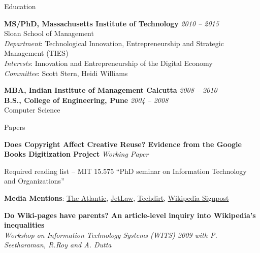 \documentclass{resume} %
\begin{document}

\begin{rSection}{Education}

{\bf MS/PhD, Massachusetts Institute of Technology} \hfill {\em 2010 -- 2015} \\ 
 Sloan School of Management  \smallskip \\
\emph{Department}: Technological Innovation, Entrepreneurship and Strategic Management (TIES) \\
\emph{Interests}: Innovation and Entrepreneurship of the Digital Economy\\
\emph{Committee}: Scott Stern, Heidi Williams

{\bf MBA, Indian Institute of Management Calcutta} \hfill {\em 2008 -- 2010} \\ 

{\bf B.S., College of Engineering, Pune} \hfill {\em 2004 -- 2008} \\ 
Computer Science

\end{rSection}


\begin{rSection}{Papers}

{\bf Does Copyright Affect Creative Reuse? Evidence from the Google Books Digitization Project} \emph{Working Paper}
\begin{rSubsection}{}{}{}{}
\item Required reading list -- MIT 15.575 ``PhD seminar on Information Technology and Organizations''
\item \textbf{Media Mentions}: \href{http://www.theatlantic.com/technology/archive/2012/07/mit-economist-heres-how-copyright-laws-impoverish-wikipedia/259970/}{The Atlantic}, \href{http://www.jetlaw.org/2012/07/26/copyright-law-and-wikipedia/}{JetLaw}, \href{http://www.techdirt.com/articles/20120719/04103519759/new-research-shows-how-copyright-law-is-keeping-useful-info-off-wikipedia.shtml}{Techdirt}, \href{http://en.wikipedia.org/wiki/Wikipedia:Wikipedia_Signpost/2012-07-30/Recent_research#How_Wikipedia_articles_benefit_from_the_availability_of_public_domain_resources}{Wikipedia Signpost}
\end{rSubsection}

{\bf Do Wiki-pages have parents? An article-level inquiry into Wikipedia's inequalities} \\ \emph{Workshop on Information Technology Systems (WITS) 2009 with P. Seetharaman, R.Roy and A. Dutta}

\end{rSection}
\end{document}
